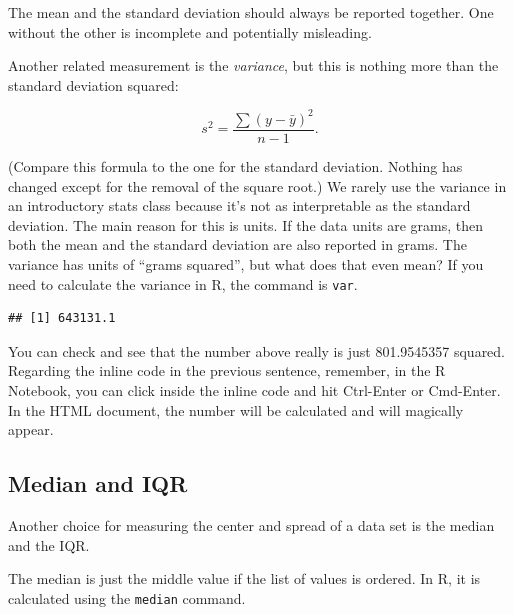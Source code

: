 \documentclass[
]{book}
\newenvironment{Shaded}{\begin{snugshade}}{\end{snugshade}}
\newcommand{\AttributeTok}[1]{\textcolor[rgb]{0.77,0.63,0.00}{#1}}
\newcommand{\ConstantTok}[1]{\textcolor[rgb]{0.00,0.00,0.00}{#1}}
\newcommand{\FunctionTok}[1]{\textcolor[rgb]{0.00,0.00,0.00}{#1}}
\newcommand{\NormalTok}[1]{#1}
\newcommand{\SpecialCharTok}[1]{\textcolor[rgb]{0.00,0.00,0.00}{#1}}
\begin{document}
The mean and the standard deviation should always be reported together. One without the other is incomplete and potentially misleading.

Another related measurement is the \emph{variance}, but this is nothing more than the standard deviation squared:

\[
s^2 = \frac{\sum (y - \bar{y})^2}{n - 1}.
\]

(Compare this formula to the one for the standard deviation. Nothing has changed except for the removal of the square root.) We rarely use the variance in an introductory stats class because it's not as interpretable as the standard deviation. The main reason for this is units. If the data units are grams, then both the mean and the standard deviation are also reported in grams. The variance has units of ``grams squared'', but what does that even mean? If you need to calculate the variance in R, the command is \texttt{var}.

\begin{Shaded}
\end{Shaded}

\begin{verbatim}
## [1] 643131.1
\end{verbatim}

You can check and see that the number above really is just 801.9545357 squared. Regarding the inline code in the previous sentence, remember, in the R Notebook, you can click inside the inline code and hit Ctrl-Enter or Cmd-Enter. In the HTML document, the number will be calculated and will magically appear.

\hypertarget{numerical-median-iqr}{%
\subsection{Median and IQR}\label{numerical-median-iqr}}

Another choice for measuring the center and spread of a data set is the median and the IQR.

The median is just the middle value if the list of values is ordered. In R, it is calculated using the \texttt{median} command.

\begin{Shaded}
\end{Shaded}
\end{document}
